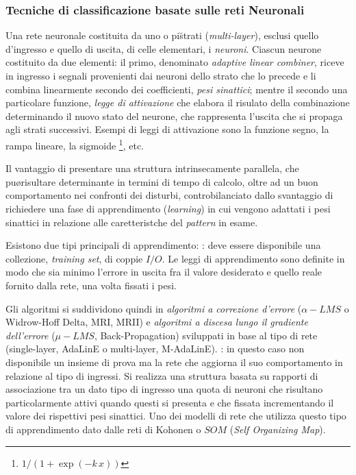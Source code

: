 \subsubsection{Tecniche di classificazione basate sulle reti Neuronali}

Una rete neuronale \cite{Bose} \e costituita da uno o pi\u strati ({\it multi-layer}), esclusi
quello d'ingresso e quello di uscita, di celle elementari, i {\it neuroni}.
Ciascun neurone \e costituito da due elementi: il primo, denominato {\it adaptive linear
combiner}, riceve in ingresso i segnali provenienti dai neuroni dello strato che
lo precede e li combina linearmente secondo dei coefficienti, {\it pesi sinattici};
mentre il secondo \e una particolare funzione, {\it legge di attivazione} che elabora
il risulato della combinazione determinando il nuovo stato del neurone, che rappresenta
l'uscita che si propaga agli strati successivi.
Esempi di leggi di attivazione sono la funzione segno, la rampa lineare, la sigmoide 
\footnote{$1/(1+\exp(-k\,x))$}, etc.

Il vantaggio di presentare una struttura intrinsecamente parallela, che pu\o risultare
determinante in termini di tempo di calcolo, oltre ad un buon comportamento nei confronti
dei disturbi, \e controbilanciato dallo svantaggio di richiedere una fase di
apprendimento ({\it learning}) in cui vengono adattati i pesi sinattici in relazione alle
caretteristche del {\it pattern} in esame. 

Esistono due tipi principali di apprendimento:
\bi
{}: deve essere disponibile una collezione, {\it training set},
     di coppie $I/O$. Le leggi di apprendimento sono definite in modo che sia
     minimo l'errore in uscita fra il valore desiderato e quello reale fornito
     dalla rete, una volta fissati i pesi.\par 
     Gli algoritmi si suddividono quindi in {\it algoritmi a correzione d'errore}
     ($\alpha-LMS$ o Widrow-Hoff Delta, MRI, MRII) e {\it algoritmi a discesa lungo il
     gradiente dell'errore} ($\mu-LMS$, Back-Propagation) sviluppati in base al tipo di 
     rete (single-layer, AdaLinE o multi-layer, M-AdaLinE). 
: in questo caso non \e disponibile un insieme di prova
    ma \e la rete che aggiorna il suo comportamento in relazione al tipo di ingressi.
    Si realizza una struttura basata su rapporti di associazione tra un dato tipo
    di ingresso \e una quota di neuroni che risultano particolarmente attivi quando
    questi si presenta e che \e fissata incrementando il valore dei rispettivi pesi
    sinattici.
    Uno dei modelli di rete che utilizza questo tipo di apprendimento \e dato dalle
    reti di Kohonen o $SOM$ ({\it Self Organizing Map}). 
\ei

